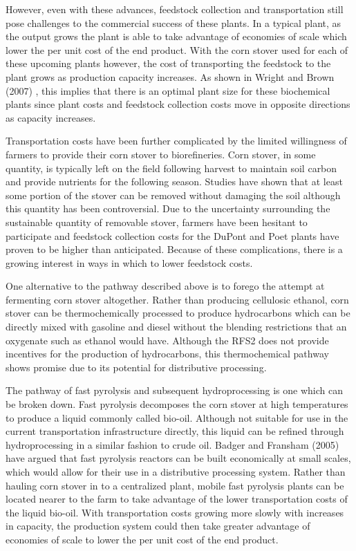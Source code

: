 \documentclass{article}\usepackage[]{graphicx}\usepackage[]{color}
\begin{document}
However, even with these advances, feedstock collection and transportation still pose challenges to the commercial success of these plants.  In a typical plant, as the output grows the plant is able to take advantage of economies of scale which lower the per unit cost of the end product.  With the corn stover used for each of these upcoming plants however, the cost of transporting the feedstock to the plant grows as production capacity increases.  As shown in Wright and Brown (2007) \cite{Wright and Brown}, this implies that there is an optimal plant size for these biochemical plants since plant costs and feedstock collection costs move in opposite directions as capacity increases.

Transportation costs have been further complicated by the limited willingness of farmers to provide their corn stover to biorefineries.  Corn stover, in some quantity, is typically left on the field following harvest to maintain soil carbon and provide nutrients for the following season.  Studies have shown that at least some portion of the stover can be removed without damaging the soil although this quantity has been controversial.  Due to the uncertainty surrounding the sustainable quantity of removable stover, farmers have been hesitant to participate and feedstock collection costs for the DuPont and Poet plants have proven to be higher than anticipated.  Because of these complications, there is a growing interest in ways in which to lower feedstock costs.

One alternative to the pathway described above is to forego the attempt at fermenting corn stover altogether.  Rather than producing cellulosic ethanol, corn stover can be thermochemically processed to produce hydrocarbons which can be directly mixed with gasoline and diesel without the blending restrictions that an oxygenate such as ethanol would have.  Although the RFS2 does not provide incentives for the production of hydrocarbons, this thermochemical pathway shows promise due to its potential for distributive processing.  

The pathway of fast pyrolysis and subsequent hydroprocessing is one which can be broken down.  Fast pyrolysis decomposes the corn stover at high temperatures to produce a liquid commonly called bio-oil.  Although not suitable for use in the current transportation infrastructure directly, this liquid can be refined through hydroprocessing in a similar fashion to crude oil.  Badger and Fransham (2005) \cite{Badger and Fransham} have argued that fast pyrolysis reactors can be built economically at small scales, which would allow for their use in a distributive processing system.  Rather than hauling corn stover in to a centralized plant, mobile fast pyrolysis plants can be located nearer to the farm to take advantage of the lower transportation costs of the liquid bio-oil.  With transportation costs growing more slowly with increases in capacity, the production system could then take greater advantage of economies of scale to lower the per unit cost of the end product.
\end{document}
